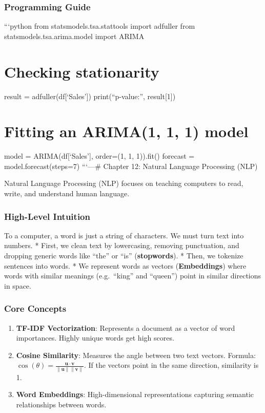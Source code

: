 \subsubsection{Programming Guide}\label{programming-guide-10}

```python from statsmodels.tsa.stattools import adfuller from
statsmodels.tsa.arima.model import ARIMA

\section{Checking stationarity}\label{checking-stationarity}

result = adfuller(df{[}`Sales'{]}) print(``p-value:'', result{[}1{]})

\section{Fitting an ARIMA(1, 1, 1)
model}\label{fitting-an-arima1-1-1-model}

model = ARIMA(df{[}`Sales'{]}, order=(1, 1, 1)).fit() forecast =
model.forecast(steps=7) ```\n\n---\n\n\# Chapter 12: Natural Language
Processing (NLP)

Natural Language Processing (NLP) focuses on teaching computers to read,
write, and understand human language.

\subsubsection{High-Level Intuition}\label{high-level-intuition-11}

To a computer, a word is just a string of characters. We must turn text
into numbers. * First, we clean text by lowercasing, removing
punctuation, and dropping generic words like ``the'' or ``is''
(\textbf{stopwords}). * Then, we tokenize sentences into words. * We
represent words as vectors (\textbf{Embeddings}) where words with
similar meanings (e.g.~``king'' and ``queen'') point in similar
directions in space.

\subsubsection{Core Concepts}\label{core-concepts-6}

\begin{enumerate}
\def\labelenumi{\arabic{enumi}.}
\tightlist
\item
  \textbf{TF-IDF Vectorization}: Represents a document as a vector of
  word importances. Highly unique words get high scores.
\item
  \textbf{Cosine Similarity}: Measures the angle between two text
  vectors. Formula:
  \(\cos(\theta) = \frac{\mathbf{u} \cdot \mathbf{v}}{\|\mathbf{u}\| \|\mathbf{v}\|}\).
  If the vectors point in the same direction, similarity is 1.
\item
  \textbf{Word Embeddings}: High-dimensional representations capturing
  semantic relationships between words.
\end{enumerate}

